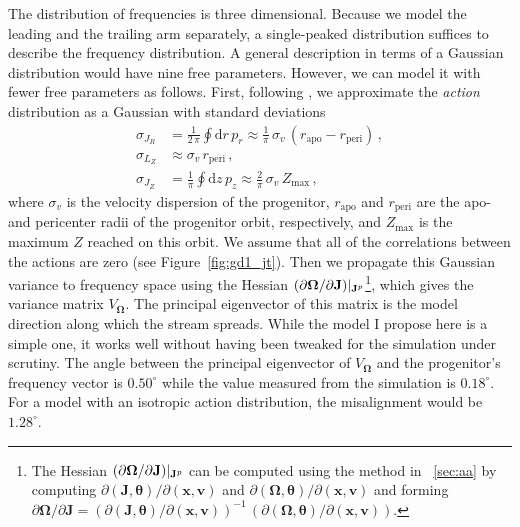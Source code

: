\documentclass[12pt,preprint]{aastex}
\newcommand{\dd}{\mathrm{d}}
\renewcommand{\figurename}{Figure}
\renewcommand{\vec}[1]{\ensuremath{\mathbf{#1}}}
\newcommand{\vecx}{\ensuremath{\vec{x}}}
\newcommand{\vecv}{\ensuremath{\vec{v}}}
\newcommand{\vecj}{\ensuremath{\vec{J}}}
\newcommand{\veco}{\ensuremath{\vec{\Omega}}}
\newcommand{\veca}{\ensuremath{\boldsymbol\theta}}
\newcommand{\sigv}{\ensuremath{\sigma_v}}
\begin{document}
The distribution of frequencies is three dimensional. Because we model
the leading and the trailing arm separately, a single-peaked
distribution suffices to describe the frequency distribution. A
general description in terms of a Gaussian distribution would have
nine free parameters. However, we can model it with fewer free
parameters as follows. First, following \citet{Eyre11a}, we
approximate the \emph{action} distribution as a Gaussian with standard
deviations
\begin{align}
  \sigma_{J_R} & = \frac{1}{2\,\pi}\oint\dd r\,p_r \approx \frac{1}{\pi}\,\sigv\,\left(r_{\mathrm{apo}}-r_{\mathrm{peri}}\right)\,,\\
  \sigma_{L_Z} & \approx  \sigv\,r_{\mathrm{peri}}\,,\\
  \sigma_{J_Z} & = \frac{1}{\pi}\oint\dd z\,p_z \approx \frac{2}{\pi}\,\sigv\,Z_{\mathrm{max}}\,,
\end{align}
where $\sigv$ is the velocity dispersion of the progenitor,
$r_{\mathrm{apo}}$ and $r_{\mathrm{peri}}$ are the apo- and pericenter
radii of the progenitor orbit, respectively, and $Z_{\mathrm{max}}$ is
the maximum $Z$ reached on this orbit. We assume that all of the
correlations between the actions are zero (see
\figurename~\ref{fig:gd1_jt}). Then we propagate this Gaussian
variance to frequency space using the Hessian $(\partial \veco /
\partial \vecj)\large|_{\vecj^p}$\footnote{The Hessian $(\partial
  \veco / \partial \vecj)\large|_{\vecj^p}$ can be computed using the
  method in \appendixname~\ref{sec:aa} by computing $\partial
  (\vecj,\veca) / \partial (\vecx,\vecv)$ and $\partial (\veco,\veca)
  / \partial (\vecx,\vecv)$ and forming $\partial \veco / \partial
  \vecj = \left(\partial (\vecj,\veca) / \partial
  (\vecx,\vecv)\right)^{-1}\,\left(\partial (\veco,\veca) / \partial
  (\vecx,\vecv)\right)$.}, which gives the variance matrix
$V_\veco$. The principal eigenvector of this matrix is the model
direction along which the stream spreads. While the model I propose
here is a simple one, it works well without having been tweaked for
the simulation under scrutiny. The angle between the principal
eigenvector of $V_\veco$ and the progenitor's frequency vector is
$0.50^\circ$ while the value measured from the simulation is
$0.18^\circ$. For a model with an isotropic action distribution, the
misalignment would be $1.28^\circ$.
\end{document}
